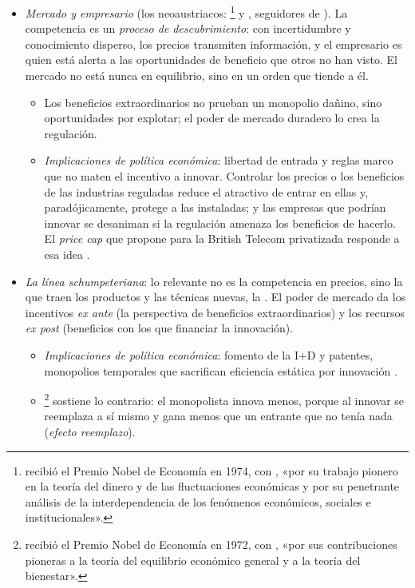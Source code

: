 \documentclass[11pt]{article}
\begin{document}
\begin{itemize}
\item \emph{Mercado y empresario} (los neoaustriacos: \footnote{ recibió el Premio Nobel de Economía en 1974, con , «por su trabajo pionero en la teoría del dinero y de las fluctuaciones económicas y por su penetrante análisis de la interdependencia de los fenómenos económicos, sociales e institucionales»\nocite{Nobel1974}.} y , seguidores de ). La competencia es un \emph{proceso de descubrimiento}: con incertidumbre y conocimiento disperso, los precios transmiten información, y el empresario es quien está alerta a las oportunidades de beneficio que otros no han visto\nocite{Kirzner1973Competition}. El mercado no está nunca en equilibrio, sino en un orden que tiende a él\nocite{Hayek1945Use}.
  \begin{itemize}
  \item Los beneficios extraordinarios no prueban un monopolio dañino, sino oportunidades por explotar; el poder de mercado duradero lo crea la regulación.
  \item \emph{Implicaciones de política económica}: libertad de entrada y reglas marco que no maten el incentivo a innovar. Controlar los precios o los beneficios de las industrias reguladas reduce el atractivo de entrar en ellas y, paradójicamente, protege a las instaladas; y las empresas que podrían innovar se desaniman si la regulación amenaza los beneficios de hacerlo. El \emph{price cap} que propone \textcite{Littlechild1983Regulation} para la British Telecom privatizada responde a esa idea .
  \end{itemize}
\item \emph{La línea schumpeteriana}\nocite{Schumpeter1942Capitalism}: lo relevante no es la competencia en precios, sino la que traen los productos y las técnicas nuevas, la . El poder de mercado da los incentivos \emph{ex ante} (la perspectiva de beneficios extraordinarios) y los recursos \emph{ex post} (beneficios con los que financiar la innovación).
  \begin{itemize}
  \item \emph{Implicaciones de política económica}: fomento de la I+D y patentes, monopolios temporales que sacrifican eficiencia estática por innovación .
  \item \textcite{Arrow1962Economic}\footnote{ recibió el Premio Nobel de Economía en 1972, con , «por sus contribuciones pioneras a la teoría del equilibrio económico general y a la teoría del bienestar»\nocite{Nobel1972HicksArrow}.} sostiene lo contrario: el monopolista innova menos, porque al innovar se reemplaza a sí mismo y gana menos que un entrante que no tenía nada (\emph{efecto reemplazo}).

\end{itemize}
\end{itemize}
\end{document}
